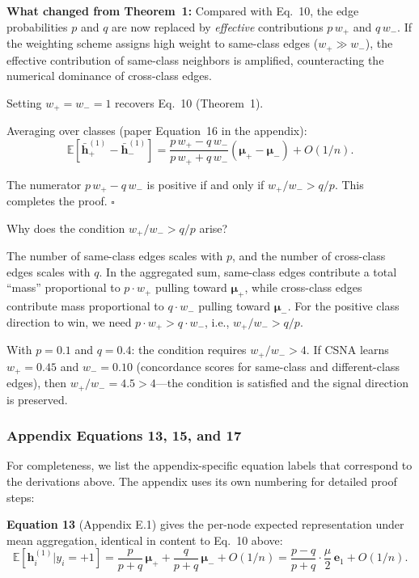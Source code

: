 \documentclass[11pt,a4paper]{article}
\newcommand{\E}{\mathbb{E}}
\newcommand{\bh}{\mathbf{h}}
\theoremstyle{definition}
\theoremstyle{plain}
\begin{document}
\textbf{What changed from Theorem~1:}
Compared with Eq.~10, the edge probabilities $p$ and $q$ are now replaced by
\emph{effective} contributions $p\,w_+$ and $q\,w_-$.
If the weighting scheme assigns high weight to same-class edges ($w_+ \gg w_-$),
the effective contribution of same-class neighbors is amplified, counteracting
the numerical dominance of cross-class edges.

Setting $w_+ = w_- = 1$ recovers Eq.~10 (Theorem~1).

Averaging over classes (paper Equation~16 in the appendix):
\begin{equation}
  \E[\bar{\bh}_+^{(1)} - \bar{\bh}_-^{(1)}]
  = \frac{p\, w_+ - q\, w_-}{p\, w_+ + q\, w_-}
  (\boldsymbol{\mu}_+ - \boldsymbol{\mu}_-) + O(1/n).
  \tag{Eq.~16}
\end{equation}

The numerator $p\, w_+ - q\, w_-$ is positive if and only if
$w_+/w_- > q/p$. This completes the proof. $\square$

\begin{example}
Why does the condition $w_+/w_- > q/p$ arise?

The number of same-class edges scales with $p$, and the number of cross-class
edges scales with $q$.
In the aggregated sum, same-class edges contribute a total ``mass'' proportional
to $p \cdot w_+$ pulling toward $\boldsymbol{\mu}_+$, while cross-class edges
contribute mass proportional to $q \cdot w_-$ pulling toward
$\boldsymbol{\mu}_-$.
For the positive class direction to win, we need
$p \cdot w_+ > q \cdot w_-$, i.e., $w_+/w_- > q/p$.

With $p = 0.1$ and $q = 0.4$: the condition requires $w_+/w_- > 4$.
If CSNA learns $w_+ = 0.45$ and $w_- = 0.10$ (concordance scores for
same-class and different-class edges), then $w_+/w_- = 4.5 > 4$---the
condition is satisfied and the signal direction is preserved.
\end{example}


\subsubsection{Appendix Equations 13, 15, and 17}

For completeness, we list the appendix-specific equation labels that
correspond to the derivations above.
The appendix uses its own numbering for detailed proof steps:

\textbf{Equation 13} (Appendix E.1) gives the per-node expected representation
under mean aggregation, identical in content to Eq.~10 above:
\begin{equation}
  \E[\bh_i^{(1)} | y_i = +1]
  = \frac{p}{p+q}\,\boldsymbol{\mu}_+
  + \frac{q}{p+q}\,\boldsymbol{\mu}_-
  + O(1/n)
  = \frac{p - q}{p + q} \cdot \frac{\mu}{2}\,\mathbf{e}_1 + O(1/n).
  \tag{Eq.~13}
\end{equation}
\end{document}
